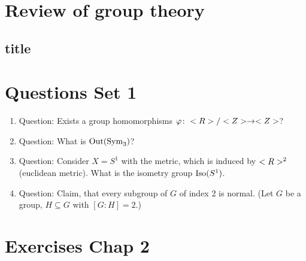\section{Review of group theory}
\subsection{title}
\section{Questions Set 1}
\begin{enumerate}
	\item Question: Exists a group homomorphisms $\varphi\colon <R>/<Z> \to <Z>$?
	\item Question: What is $\operatorname{Out}(\operatorname{Sym}_3)$?
	\item Question: Consider $X=S^1$ with the metric, which is induced by $<R>^2$ (euclidean metric). What is the isometry group $\operatorname{Iso}(S^1)$.
	\item Question: Claim, that every subgroup of $G$ of index 2 is normal. (Let $G$ be a group, $H \subseteq G$ with $[G\colon H] = 2$.) 
\end{enumerate}
\section{Exercises Chap 2}
